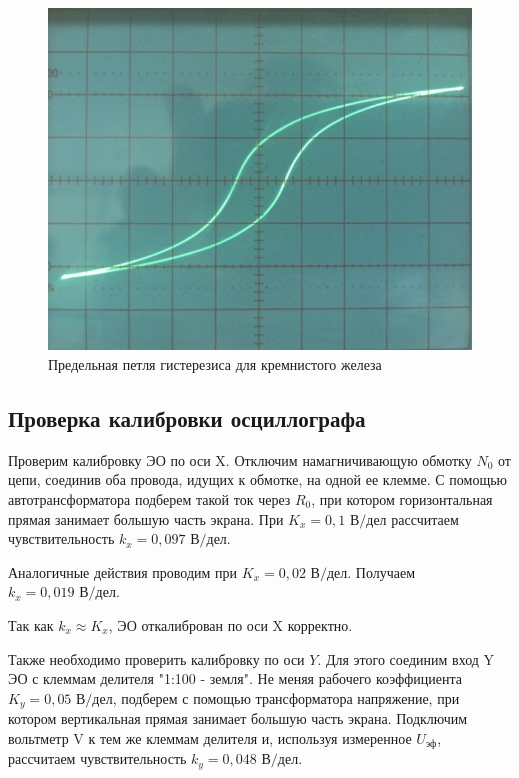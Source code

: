 \documentclass[12pt,a4paper]{article}
\begin{document}
\begin{figure}[h!]
	\centering
	\includegraphics[scale=0.3]{Si_Fe.jpg}
	\caption{Предельная петля гистерезиса для кремнистого железа}
\end{figure}

\subsection{Проверка калибровки осциллографа}

Проверим калибровку ЭО по оси X. Отключим намагничивающую обмотку $N_0$ от цепи, соединив оба провода, идущих к обмотке, на одной ее клемме. С помощью автотрансформатора подберем такой ток через $R_0$, при котором горизонтальная прямая занимает большую часть экрана. При $ K_x=0,1 \text{ В/дел} $ рассчитаем чувствительность $k_x=0,097 \text{ В/дел}$.

Аналогичные действия проводим при $ K_x =0,02 \text{ В/дел} $. Получаем $ k_x=0,019 \text{ В/дел} $.

Так как $k_x \approx K_x$, ЭО откалиброван по оси X корректно.

Также необходимо проверить калибровку по оси $ Y $. Для этого соединим вход Y ЭО с клеммам делителя "1:100 - земля". Не меняя рабочего коэффициента $K_y = 0,05\text{ В/дел}$, подберем с помощью трансформатора напряжение, при котором вертикальная прямая занимает большую часть экрана. Подключим вольтметр V к тем же клеммам делителя и, используя измеренное $U_{\text{эф}}$, рассчитаем чувствительность $k_y=0,048\text{ В/дел}$.
\end{document}

